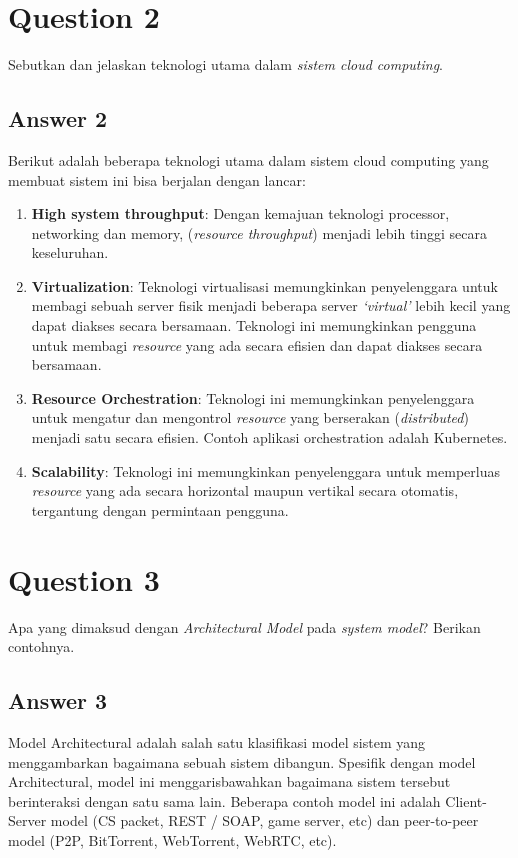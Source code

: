 \documentclass[
	11pt, %
	indonesian
]{assignment}
\begin{document}
\section*{Question 2}
\begin{problem}
Sebutkan dan jelaskan teknologi utama dalam \textit{sistem cloud computing}.
\end{problem}

\subsection*{Answer 2}

Berikut adalah beberapa teknologi utama dalam sistem cloud computing yang membuat sistem ini bisa berjalan dengan lancar:

\begin{enumerate}
	\item \textbf{High system throughput}: Dengan kemajuan teknologi processor, networking dan memory, (\textit{resource throughput}) menjadi lebih tinggi secara keseluruhan.
	\item \textbf{Virtualization}: Teknologi virtualisasi memungkinkan penyelenggara untuk membagi sebuah server fisik menjadi beberapa server \textit{`virtual'} lebih kecil yang dapat diakses secara bersamaan. Teknologi ini memungkinkan pengguna untuk membagi \textit{resource} yang ada secara efisien dan dapat diakses secara bersamaan.
	\item \textbf{Resource Orchestration}: Teknologi ini memungkinkan penyelenggara untuk mengatur dan mengontrol \textit{resource} yang berserakan (\textit{distributed}) menjadi satu secara efisien. Contoh aplikasi orchestration adalah Kubernetes.
	\item \textbf{Scalability}: Teknologi ini memungkinkan penyelenggara untuk memperluas \textit{resource} yang ada secara horizontal maupun vertikal secara otomatis, tergantung dengan permintaan pengguna.
\end{enumerate}

\section*{Question 3}
\begin{problem}
Apa yang dimaksud dengan \textit{Architectural Model} pada \textit{system model}? Berikan contohnya.
\end{problem}

\subsection*{Answer 3}
Model Architectural adalah salah satu klasifikasi model sistem yang menggambarkan bagaimana sebuah sistem dibangun. Spesifik dengan model Architectural, model ini menggarisbawahkan bagaimana sistem tersebut berinteraksi dengan satu sama lain. Beberapa contoh model ini adalah Client-Server model (CS packet, REST / SOAP, game server, etc) dan peer-to-peer model (P2P, BitTorrent, WebTorrent, WebRTC, etc).
\end{document}
